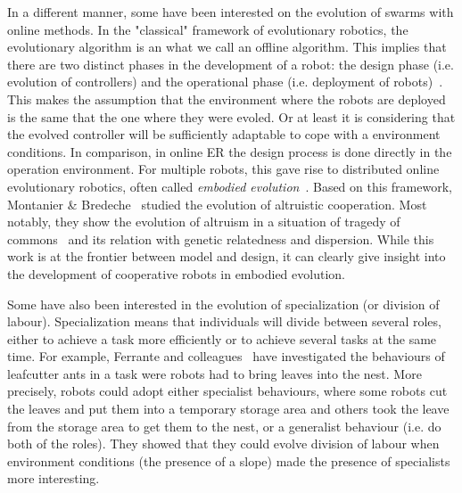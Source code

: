     In a different manner, some have been interested on the evolution of swarms with online methods. In the "classical" framework of evolutionary robotics, the evolutionary algorithm is an what we call an offline algorithm. This implies that there are two distinct phases in the development of a robot: the design phase (i.e. evolution of controllers) and the operational phase (i.e. deployment of robots)~\cite{Doncieux2015a, Francesca2016}. This makes the assumption that the environment where the robots are deployed is the same that the one where they were evoled. Or at least it is considering that the evolved controller will be sufficiently adaptable to cope with a environment conditions. In comparison, in online ER the design process is done directly in the operation environment. For multiple robots, this gave rise to distributed online evolutionary robotics, often called \emph{embodied evolution}~\cite{Ficici1999, Watson2002}. Based on this framework, Montanier & Bredeche~\cite{Montanier2011, Montanier2013} studied the evolution of altruistic cooperation. Most notably, they show the evolution of altruism in a situation of tragedy of commons~\cite{Hardin1968} and its relation with genetic relatedness and dispersion. While this work is at the frontier between model and design, it can clearly give insight into the development of cooperative robots in embodied evolution.

    Some have also been interested in the evolution of specialization (or division of labour). Specialization means that individuals will divide between several roles, either to achieve a task more efficiently or to achieve several tasks at the same time. For example, Ferrante and colleagues~\cite{Ferrante2015} have investigated the behaviours of leafcutter ants in a task were robots had to bring leaves into the nest. More precisely, robots could adopt either specialist behaviours, where some robots cut the leaves and put them into a temporary storage area and others took the leave from the storage area to get them to the nest, or a generalist behaviour (i.e. do both of the roles). They showed that they could evolve division of labour when environment conditions (the presence of a slope) made the presence of specialists more interesting.


